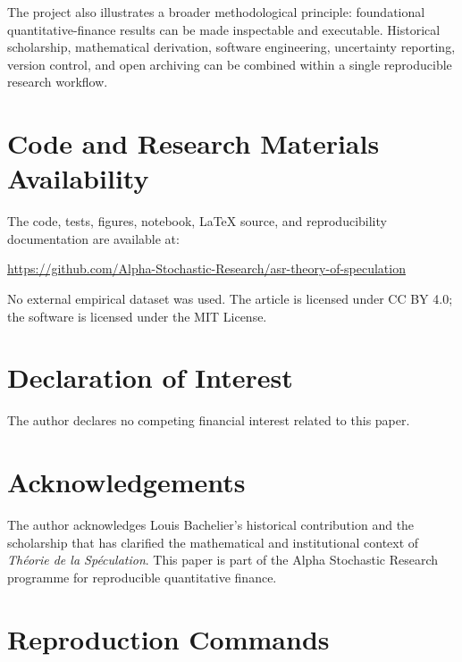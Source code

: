 \documentclass[11pt,a4paper]{article}
\begin{document}
The project also illustrates a broader methodological principle: foundational quantitative-finance results can be made inspectable and executable. Historical scholarship, mathematical derivation, software engineering, uncertainty reporting, version control, and open archiving can be combined within a single reproducible research workflow.

\section*{Code and Research Materials Availability}

The code, tests, figures, notebook, LaTeX source, and reproducibility documentation are available at:

\begin{center}
\url{https://github.com/Alpha-Stochastic-Research/asr-theory-of-speculation}
\end{center}

No external empirical dataset was used. The article is licensed under CC BY 4.0; the software is licensed under the MIT License.

\section*{Declaration of Interest}

The author declares no competing financial interest related to this paper.

\section*{Acknowledgements}

The author acknowledges Louis Bachelier's historical contribution and the scholarship that has clarified the mathematical and institutional context of \emph{Th\'eorie de la Sp\'eculation}. This paper is part of the Alpha Stochastic Research programme for reproducible quantitative finance.

\appendix
\section{Reproduction Commands}
\end{document}
